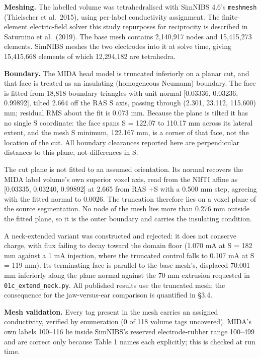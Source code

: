 \documentclass[
  11pt,
  a4paper,
]{article}
\begin{document}
\textbf{Meshing.} The labelled volume was tetrahedralised with SimNIBS 4.6's
\texttt{meshmesh} (Thielscher et al.~2015), using per-label conductivity assignment. The
finite-element electric-field solver this study repurposes for reciprocity is
described in Saturnino et al.~(2019). The base mesh contains
2,140,917 nodes and 15,415,273 elements. SimNIBS meshes the two electrodes into
it at solve time, giving 15,415,668 elements of which 12,294,182 are tetrahedra.

\textbf{Boundary.} The MIDA head model is truncated inferiorly on a planar cut, and
that face is treated as an insulating (homogeneous Neumann) boundary. The face
is fitted from 18,818 boundary triangles with unit normal {[}\textminus{}0.03336, \textminus{}0.03236,
\textminus{}0.99892{]}, tilted 2.664\textdegree{} off the RAS S axis, passing through (\textminus{}2.301, 23.112,
\textminus{}115.600) mm; residual RMS about the fit is 0.073 mm. Because the plane is
tilted it has no single S coordinate: the face spans S = \textminus{}122.07 to \textminus{}110.17 mm
across its lateral extent, and the mesh S minimum, \textminus{}122.167 mm, is a corner of
that face, not the location of the cut. All boundary clearances reported here
are perpendicular distances to this plane, not differences in S.

The cut plane is not fitted to an assumed orientation. Its normal recovers the
MIDA label volume's own superior voxel axis, read from the NIfTI affine as
{[}0.03335, 0.03240, 0.99892{]} at 2.665\textdegree{} from RAS +S with a 0.500 mm step, agreeing
with the fitted normal to 0.0026\textdegree{}. The truncation therefore lies on a voxel plane
of the source segmentation. No node of the mesh lies more than 0.276 mm outside
the fitted plane, so it is the outer boundary and carries the insulating
condition.

A neck-extended variant was constructed and rejected: it does not conserve
charge, with flux failing to decay toward the domain floor (1.070 mA at S =
\textminus{}182 mm against a 1 mA injection, where the truncated control falls to 0.107 mA
at S = \textminus{}119 mm). Its terminating face is parallel to the base mesh's, displaced
70.001 mm inferiorly along the plane normal against the 70 mm extrusion
requested in \texttt{01c\_extend\_neck.py}. All published results use the truncated mesh;
the consequence for the jaw-versus-ear comparison is quantified in §3.4.

\textbf{Mesh validation.} Every tag present in the mesh carries an assigned
conductivity, verified by enumeration (0 of 118 volume tags uncovered). MIDA's
own labels 100--116 lie inside SimNIBS's reserved electrode-rubber range 100--499
and are correct only because Table 1 names each explicitly; this is checked at
run time.
\end{document}
